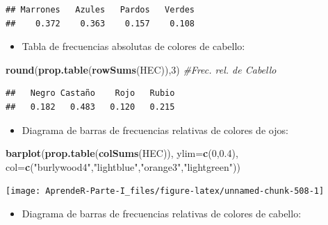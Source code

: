 \documentclass[]{book}
\newenvironment{Shaded}{\begin{snugshade}}{\end{snugshade}}
\newcommand{\CommentTok}[1]{\textcolor[rgb]{0.56,0.35,0.01}{\textit{#1}}}
\newcommand{\DataTypeTok}[1]{\textcolor[rgb]{0.13,0.29,0.53}{#1}}
\newcommand{\DecValTok}[1]{\textcolor[rgb]{0.00,0.00,0.81}{#1}}
\newcommand{\FloatTok}[1]{\textcolor[rgb]{0.00,0.00,0.81}{#1}}
\newcommand{\KeywordTok}[1]{\textcolor[rgb]{0.13,0.29,0.53}{\textbf{#1}}}
\newcommand{\NormalTok}[1]{#1}
\newcommand{\StringTok}[1]{\textcolor[rgb]{0.31,0.60,0.02}{#1}}
\providecommand{\tightlist}{%
  \setlength{\itemsep}{0pt}\setlength{\parskip}{0pt}}
\theoremstyle{definition}
\theoremstyle{definition}
\theoremstyle{definition}
\theoremstyle{remark}
\begin{document}
\begin{verbatim}
## Marrones   Azules   Pardos   Verdes 
##    0.372    0.363    0.157    0.108
\end{verbatim}

\begin{itemize}
\tightlist
\item
  Tabla de frecuencias absolutas de colores de cabello:
\end{itemize}

\begin{Shaded}
\begin{Highlighting}[]
\KeywordTok{round}\NormalTok{(}\KeywordTok{prop.table}\NormalTok{(}\KeywordTok{rowSums}\NormalTok{(HEC)),}\DecValTok{3}\NormalTok{)   }\CommentTok{#Frec. rel. de Cabello}
\end{Highlighting}
\end{Shaded}

\begin{verbatim}
##   Negro Castaño    Rojo   Rubio 
##   0.182   0.483   0.120   0.215
\end{verbatim}

\begin{itemize}
\tightlist
\item
  Diagrama de barras de frecuencias relativas de colores de ojos:
\end{itemize}

\begin{Shaded}
\begin{Highlighting}[]
\KeywordTok{barplot}\NormalTok{(}\KeywordTok{prop.table}\NormalTok{(}\KeywordTok{colSums}\NormalTok{(HEC)), }\DataTypeTok{ylim=}\KeywordTok{c}\NormalTok{(}\DecValTok{0}\NormalTok{,}\FloatTok{0.4}\NormalTok{),}
  \DataTypeTok{col=}\KeywordTok{c}\NormalTok{(}\StringTok{"burlywood4"}\NormalTok{,}\StringTok{"lightblue"}\NormalTok{,}\StringTok{"orange3"}\NormalTok{,}\StringTok{"lightgreen"}\NormalTok{))}
\end{Highlighting}
\end{Shaded}

\begin{center}\texttt{[image: AprendeR-Parte-I\_files/figure-latex/unnamed-chunk-508-1]} \end{center}

\begin{itemize}
\tightlist
\item
  Diagrama de barras de frecuencias relativas de colores de cabello:
\end{itemize}
\end{document}
